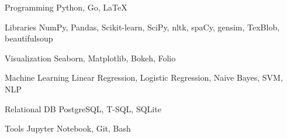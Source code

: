 

\begin{cvskills}
	
	\cvskill
	{Programming} %
	{Python, Go, LaTeX} %
	
	\cvskill
	{Libraries} %
	{NumPy, Pandas, Scikit-learn, SciPy, nltk, spaCy, gensim, TexBlob, beautifulsoup} %
	
	\cvskill
	{Visualization} %
	{Seaborn, Matplotlib, Bokeh, Folio} %
	
	\cvskill
	{Machine Learning} %
	{Linear Regression, Logistic Regression, 
		Naive Bayes, SVM, NLP} %
	
	\cvskill
	{Relational DB} %
	{PostgreSQL, T-SQL, SQLite} %
	
	\cvskill
	{Tools} %
	{Jupyter Notebook, Git, Bash} %
	
	
	\vspace*{-4mm}
\end{cvskills}
